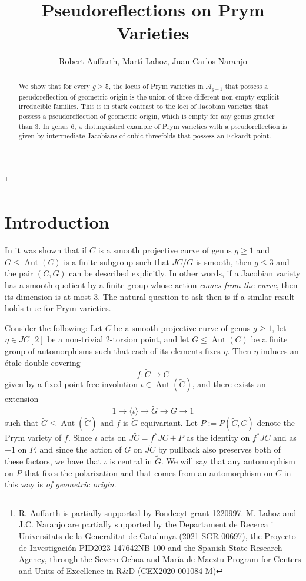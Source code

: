 \documentclass[preprint,12pt]{amsart}
\title{Pseudoreflections on Prym Varieties}
\author[R. Auffarth, M. Lahoz, J.C. Naranjo]{Robert Auffarth, Mart\'{\i} Lahoz, Juan Carlos Naranjo}
\def\cA{\ensuremath{\mathcal{A}}}
\def\tC{\ensuremath{\tilde{C}}}
\DeclareMathOperator{\Aut}{Aut}
\theoremstyle{plain}
\theoremstyle{definition}
\begin{document}
\begin{abstract}
We show that for every $g\geq 5$, the locus of Prym varieties in $\cA_{g-1}$ that possess a pseudoreflection of geometric origin is the union of three different non-empty explicit irreducible families.
This is in stark contrast to the loci of Jacobian varieties that possess a pseudoreflection of geometric origin, which is empty for any genus greater than 3.
In genus $6$, a distinguished example of Prym varieties with a pseudoreflection is given by intermediate Jacobians of cubic threefolds that possess an Eckardt point.
\end{abstract}

\thanks{R. Auffarth is partially supported by Fondecyt grant 1220997. M. Lahoz and J.C. Naranjo are partially supported by the Departament de Recerca i Universitats de la Generalitat de Catalunya (2021 SGR 00697), the Proyecto de Investigaci\'on PID2023-147642NB-100 and the Spanish State Research Agency, through the Severo Ochoa and María de Maeztu Program for Centers and Units of Excellence in R\&D (CEX2020-001084-M)}



\maketitle

\section{Introduction}

In \cite[Theorem~1.2]{ALA} it was shown that if $C$ is a smooth projective curve of genus $g\geq 1$ and $G\leq\Aut(C)$ is a finite subgroup such that $JC/G$ is smooth, then $g\leq 3$ and the pair $(C,G)$ can be described explicitly.
In other words, if a Jacobian variety has a smooth quotient by a finite group whose action \textit{comes from the curve}, then its dimension is at most $3$.
The natural question to ask then is if a similar result holds true for Prym varieties.

Consider the following: Let $C$ be a smooth projective curve of genus $g\geq 1$, let $\eta\in JC[2]$ be a non-trivial 2-torsion point, and let $G\leq\Aut(C)$ be a finite group of automorphisms such that each of its elements fixes $\eta$.
Then $\eta$ induces an \'etale double covering
\[f:\tC\to C\]
given by a fixed point free involution $\iota\in\Aut(\tC)$, and there exists an extension 
\[1\to\langle\iota\rangle\to\tilde{G}\to G\to 1\]
such that $\tilde{G}\leq\Aut(\tC)$ and $f$ is $\tilde{G}$-equivariant.
Let $P:=P(\tC,C)$ denote the Prym variety of $f$.
Since $\iota$ acts on $J\tC=f^*JC+P$ as the identity on $f^*JC$ and as $-1$ on $P$, and since the action of $\tilde{G}$ on $J\tC$ by pullback also preserves both of these factors, we have that $\iota$ is central in $\tilde{G}$.
We will say that any automorphism on $P$ that fixes the polarization and that comes from an automorphism on $C$ in this way is \textit{of geometric origin}.
\end{document}
